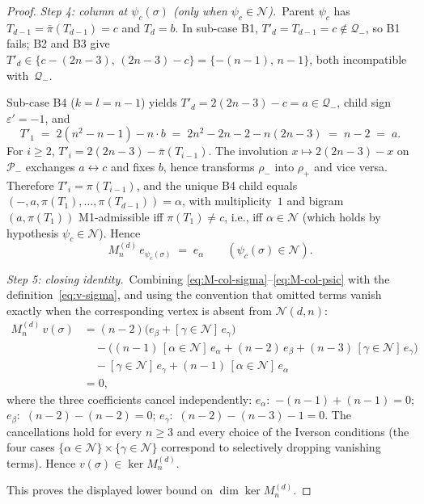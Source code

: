 \documentclass{amsart}
\theoremstyle{definition}
\theoremstyle{remark}
\begin{document}
\begin{proof}
\smallskip
\textit{Step 4: column at $\psi_c(\sigma)$
\textup{(}only when $\psi_c \in \mathcal{N}$\textup{)}.}\
Parent $\psi_c$ has $T_{d-1} = \bar\pi(T_{d-1}) = c$ and
$T_d = b$.  In sub-case B1, $T'_d = T_{d-1} = c \notin
\mathcal{Q}_-$, so B1 fails; B2 and B3 give
$T'_d \in \{c - (2n-3),\, (2n-3) - c\} = \{-(n-1),\, n-1\}$,
both incompatible with~$\mathcal{Q}_-$.

Sub-case B4 ($k = l = n-1$) yields
$T'_d = 2(2n-3) - c = a \in \mathcal{Q}_-$, child sign
$\varepsilon' = -1$, and
\[
  T'_1 \;=\; 2(n^2 - n - 1) - n \cdot b
       \;=\; 2n^2 - 2n - 2 - n(2n-3)
       \;=\; n - 2 \;=\; a.
\]
For $i \ge 2$, $T'_i = 2(2n-3) - \bar\pi(T_{i-1})$.  The
involution $x \mapsto 2(2n-3) - x$ on $\mathcal{P}_-$ exchanges
$a \leftrightarrow c$ and fixes $b$, hence transforms $\rho_-$
into $\rho_+$ and vice versa.  Therefore
$T'_i = \pi(T_{i-1})$, and the unique B4 child equals
$(-, a, \pi(T_1), \ldots, \pi(T_{d-1})) = \alpha$, with
multiplicity~$1$ and bigram $(a, \pi(T_1))$ M1-admissible iff
$\pi(T_1) \neq c$, i.e., iff $\alpha \in \mathcal{N}$
(which holds by hypothesis $\psi_c \in \mathcal{N}$).  Hence
\begin{equation}\label{eq:M-col-psic}
  M_n^{(d)}\,e_{\psi_c(\sigma)} \;=\; e_\alpha
  \qquad (\psi_c(\sigma) \in \mathcal{N}).
\end{equation}

\smallskip
\textit{Step 5: closing identity.}\
Combining \eqref{eq:M-col-sigma}--\eqref{eq:M-col-psic} with the
definition~\eqref{eq:v-sigma}, and using the convention that
omitted terms vanish exactly when the corresponding vertex is
absent from $\mathcal{N}(d, n)$:
\begin{align*}
  M_n^{(d)}\,v(\sigma)
   &= (n-2)\bigl(e_\beta + [\gamma \in \mathcal{N}]\,e_\gamma\bigr)\\
   &\quad - \bigl((n-1)\,[\alpha \in \mathcal{N}]\,e_\alpha
              + (n-2)\,e_\beta
              + (n-3)\,[\gamma \in \mathcal{N}]\,e_\gamma\bigr)\\
   &\quad - [\gamma \in \mathcal{N}]\,e_\gamma
        + (n-1)\,[\alpha \in \mathcal{N}]\,e_\alpha\\
   &= 0,
\end{align*}
where the three coefficients cancel independently:
$e_\alpha$:\ $-(n-1) + (n-1) = 0$;
$e_\beta$:\ $(n-2) - (n-2) = 0$;
$e_\gamma$:\ $(n-2) - (n-3) - 1 = 0$.
The cancellations hold for every $n \ge 3$ and every choice of
the Iverson conditions (the four cases
$\{\alpha \in \mathcal{N}\} \times \{\gamma \in \mathcal{N}\}$
correspond to selectively dropping vanishing terms).  Hence
$v(\sigma) \in \ker M_n^{(d)}$.

This proves the displayed lower bound on $\dim \ker M_n^{(d)}$.
\end{proof}
\end{document}
